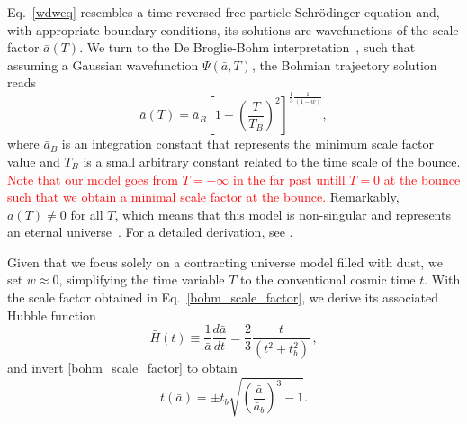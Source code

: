 \documentclass[a4paper,11pt]{article}
\newcommand{\dpar}[1]{\left(#1 \right)}
\newcommand{\dcol}[1]{\left[#1 \right]}
\begin{document}
Eq.~\eqref{wdweq} resembles a time-reversed free particle Schrödinger equation and, with appropriate boundary conditions, its solutions are wavefunctions of the scale factor $\bar{a}(T)$. We turn to the De Broglie-Bohm interpretation~\cite{mukhanov2005physical,nelson2000bohm}, such that assuming a Gaussian wavefunction $\Psi(\bar{a},T)$, the Bohmian trajectory solution reads
\begin{equation}
\label{bohm_scale_factor}
            \bar{a}(T) = \bar{a}_{B}\dcol{1 + \dpar{ \frac{T}{T_{ B}} }^2 }^{{\frac{1}{3}\frac{1}{\dpar{1-w}} } }  ,
        \end{equation}
        where $\bar{a}_{B}$ is an integration constant that represents the minimum scale factor value and $T_B$ is a small arbitrary constant related to the time scale of the bounce.  \textcolor{red}{Note that our model goes from $T=-\infty$ in the far past untill $T=0$ at the bounce such that we obtain a minimal scale factor at the bounce.} Remarkably, $\bar{a}(T) \neq 0$ for all $T$, which means that this model is non-singular and represents an eternal universe~\cite{nelson_peter_bouncing_original}. For a detailed derivation, see \cite{nelson2021bouncing}.

        Given that we focus solely on a contracting universe model filled with dust, we set $w \approx 0$, simplifying the time variable $T$ to the conventional cosmic time $t$. With the scale factor obtained in Eq.~\eqref{bohm_scale_factor}, we derive its associated Hubble function
        \begin{equation}\label{bohm_hubble}
            \bar{H}(t) \equiv \frac{1}{\bar{a}}\frac{d\bar{a}}{dt} = \frac{2}{3}\frac{t}{ \dpar{ t^{2} + t^{2}_{b} } }\, ,
        \end{equation}
        and invert \eqref{bohm_scale_factor} to obtain
        \begin{equation}\label{bohm_time}
            t(\bar{a}) = \pm t_{b}\sqrt{ \dpar{\frac{\bar{a}}{\bar{a}_{b}}}^{3} - 1 } .
        \end{equation}
        
\end{document}
